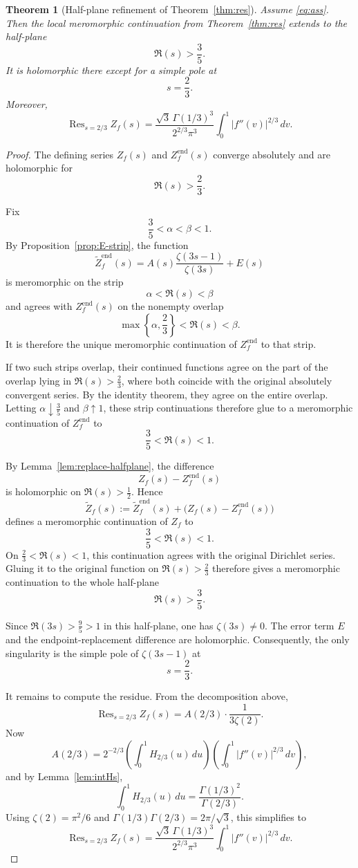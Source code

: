 \documentclass[a4paper,american,11pt]{amsart}
\theoremstyle{plain}
\newtheorem{theorem}{Theorem}[section]
\theoremstyle{definition}
\DeclareMathOperator*{\Res}{Res}
\begin{document}
\begin{theorem}[Half-plane refinement of Theorem~\ref{thm:res}]
\label{thm:res-halfplane}
Assume \eqref{eq:ass}. Then the local meromorphic continuation from
Theorem~\ref{thm:res} extends to the half-plane
\[
\Re(s)>\frac35.
\]
It is holomorphic there except for a simple pole at
\[
s=\frac23.
\]
Moreover,
\[
\Res_{s=2/3} Z_f(s)
=
\frac{\sqrt3\,\Gamma(1/3)^3}{2^{2/3}\pi^3}
\int_0^1 |f''(v)|^{2/3}\,dv.
\]
\end{theorem}

\begin{proof}

The defining series \(Z_f(s)\) and \(Z_f^{\mathrm{end}}(s)\) converge
absolutely and are holomorphic for
\[
\Re(s)>\frac23.
\]

Fix
\[
\frac35<\alpha<\beta<1.
\]
By Proposition~\ref{prop:E-strip}, the function
\[
\widetilde Z_f^{\mathrm{end}}(s)
=
A(s)\frac{\zeta(3s-1)}{\zeta(3s)}+E(s)
\]
is meromorphic on the strip
\[
\alpha<\Re(s)<\beta
\]
and agrees with \(Z_f^{\mathrm{end}}(s)\) on the nonempty overlap
\[
\max\left\{\alpha,\frac23\right\}<\Re(s)<\beta.
\]
It is therefore the unique meromorphic continuation of
\(Z_f^{\mathrm{end}}\) to that strip.

If two such strips overlap, their continued functions agree on the part of
the overlap lying in \(\Re(s)>\frac23\), where both coincide with the
original absolutely convergent series. By the identity theorem, they agree
on the entire overlap. Letting \(\alpha\downarrow\frac35\) and
\(\beta\uparrow1\), these strip continuations therefore glue to a
meromorphic continuation of \(Z_f^{\mathrm{end}}\) to
\[
\frac35<\Re(s)<1.
\]

By Lemma~\ref{lem:replace-halfplane}, the difference
\[
Z_f(s)-Z_f^{\mathrm{end}}(s)
\]
is holomorphic on \(\Re(s)>\frac12\). Hence
\[
\widetilde Z_f(s)
:=
\widetilde Z_f^{\mathrm{end}}(s)
+
\bigl(Z_f(s)-Z_f^{\mathrm{end}}(s)\bigr)
\]
defines a meromorphic continuation of \(Z_f\) to
\[
\frac35<\Re(s)<1.
\]
On \(\frac23<\Re(s)<1\), this continuation agrees with the original
Dirichlet series. Gluing it to the original function on
\(\Re(s)>\frac23\) therefore gives a meromorphic continuation to the whole
half-plane
\[
\Re(s)>\frac35.
\]

Since \(\Re(3s)>\frac95>1\) in this half-plane, one has
\(\zeta(3s)\neq0\). The error term \(E\) and the endpoint-replacement
difference are holomorphic. Consequently, the only singularity is the
simple pole of \(\zeta(3s-1)\) at
\[
s=\frac23.
\]

It remains to compute the residue. From the decomposition above,
\[
\Res_{s=2/3}Z_f(s)
=
A(2/3)\cdot \frac{1}{3\zeta(2)}.
\]
Now
\[
A(2/3)
=
2^{-2/3}\left(\int_0^1 H_{2/3}(u)\,du\right)\left(\int_0^1 |f''(v)|^{2/3}\,dv\right),
\]
and by Lemma~\ref{lem:intHs},
\[
\int_0^1 H_{2/3}(u)\,du=\frac{\Gamma(1/3)^2}{\Gamma(2/3)}.
\]
Using \(\zeta(2)=\pi^2/6\) and \(\Gamma(1/3)\Gamma(2/3)=2\pi/\sqrt3\), this simplifies to
\[
\Res_{s=2/3} Z_f(s)
=
\frac{\sqrt3\,\Gamma(1/3)^3}{2^{2/3}\pi^3}
\int_0^1 |f''(v)|^{2/3}\,dv.
\]
\end{proof}
\end{document}
